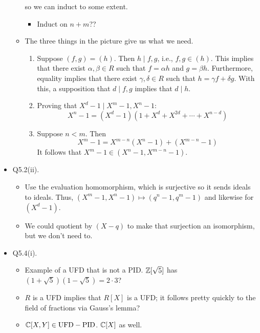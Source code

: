 \documentclass[../notes.tex]{subfiles}
\begin{document}
\begin{itemize}
\begin{itemize}
        so we can induct to some extent.
        \begin{itemize}
            \item Induct on $n+m$??
        \end{itemize}
        \item The three things in the picture give us what we need.
        \begin{enumerate}
            \item Suppose $(f,g)=(h)$. Then $h\mid f,g$, i.e., $f,g\in(h)$. This implies that there exist $\alpha,\beta\in R$ such that $f=\alpha h$ and $g=\beta h$. Furthermore, equality implies that there exist $\gamma,\delta\in R$ such that $h=\gamma f+\delta g$. With this, a supposition that $d\mid f,g$ implies that $d\mid h$.
            \item Proving that $X^d-1\mid X^m-1,X^n-1$:
            \begin{equation*}
                X^n-1 = (X^d-1)(1+X^d+X^{2d}+\cdots+X^{n-d})
            \end{equation*}
            \item Suppose $n<m$. Then
            \begin{equation*}
                X^m-1 = X^{m-n}(X^n-1)+(X^{m-n}-1)
            \end{equation*}
            It follows that $X^m-1\in(X^n-1,X^{m-n}-1)$.
        \end{enumerate}
    \end{itemize}
    \item Q5.2(ii).
    \begin{itemize}
        \item Use the evaluation homomorphism, which is surjective so it sends ideals to ideals. Thus, $(X^m-1,X^n-1)\mapsto(q^n-1,q^m-1)$ and likewise for $(X^d-1)$.
        \item We could quotient by $(X-q)$ to make that surjection an isomorphism, but we don't need to.
    \end{itemize}
    \item Q5.4(i).
    \begin{itemize}
        \item Example of a UFD that is not a PID. $\mathbb{Z}[\sqrt{5}]$ has $(1+\sqrt{5})(1-\sqrt{5})=2\cdot 3$?
        \item $R$ is a UFD implies that $R[X]$ is a UFD; it follows pretty quickly to the field of fractions via Gauss's lemma?
        \item $\mathbb{C}[X,Y]\in\text{UFD}-\text{PID}$. $\mathbb{C}[X]$ as well.

\end{itemize}
\end{itemize}
\end{document}
